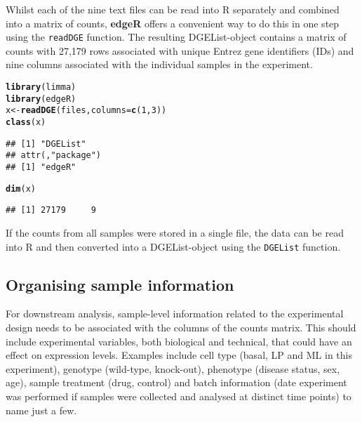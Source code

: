 \documentclass[10pt,a4paper]{extarticle}\usepackage[]{graphicx}\usepackage[]{color}
\makeatletter
\newcommand{\hlnum}[1]{\textcolor[rgb]{0.686,0.059,0.569}{#1}}%
\newcommand{\hlstd}[1]{\textcolor[rgb]{0.345,0.345,0.345}{#1}}%
\newcommand{\hlkwb}[1]{\textcolor[rgb]{0.69,0.353,0.396}{#1}}%
\newcommand{\hlkwc}[1]{\textcolor[rgb]{0.333,0.667,0.333}{#1}}%
\newcommand{\hlkwd}[1]{\textcolor[rgb]{0.737,0.353,0.396}{\textbf{#1}}}%
\newenvironment{kframe}{%
 \def\at@end@of@kframe{}%
 \ifinner\ifhmode%
  \def\at@end@of@kframe{\end{minipage}}%
  \begin{minipage}{\columnwidth}%
 \fi\fi%
 \def\FrameCommand##1{\hskip\@totalleftmargin \hskip-\fboxsep
 \colorbox{shadecolor}{##1}\hskip-\fboxsep
     \hskip-\linewidth \hskip-\@totalleftmargin \hskip\columnwidth}%
 \MakeFramed {\advance\hsize-\width
   \@totalleftmargin\z@ \linewidth\hsize
   \@setminipage}}%
 {\par\unskip\endMakeFramed%
 \at@end@of@kframe}
\newenvironment{knitrout}{}{} %
\makeatother
\begin{document}
Whilst each of the nine text files can be read into \textsf{R} separately and combined into a matrix of counts, \textbf{edgeR} offers a convenient way to do this in one step using the \texttt{readDGE} function. The resulting DGEList-object contains a matrix of counts with 27,179 rows associated with unique Entrez gene identifiers (IDs) and nine columns associated with the individual samples in the experiment.
\begin{knitrout}
\color{fgcolor}\begin{kframe}
\begin{alltt}
\hlkwd{library}\hlstd{(limma)}
\hlkwd{library}\hlstd{(edgeR)}
\hlstd{x} \hlkwb{<-} \hlkwd{readDGE}\hlstd{(files,} \hlkwc{columns}\hlstd{=}\hlkwd{c}\hlstd{(}\hlnum{1}\hlstd{,}\hlnum{3}\hlstd{))}
\hlkwd{class}\hlstd{(x)}
\end{alltt}
\begin{verbatim}
## [1] "DGEList"
## attr(,"package")
## [1] "edgeR"
\end{verbatim}
\begin{alltt}
\hlkwd{dim}\hlstd{(x)}
\end{alltt}
\begin{verbatim}
## [1] 27179     9
\end{verbatim}
\end{kframe}
\end{knitrout}

If the counts from all samples were stored in a single file, the data can be read into \textsf{R} and then converted into a DGEList-object using the \texttt{DGEList} function.

\subsection*{Organising sample information}
For downstream analysis, sample-level information related to the experimental design needs to be associated with the columns of the counts matrix. This should include experimental variables, both biological and technical, that could have an effect on expression levels. Examples include cell type (basal, LP and ML in this experiment), genotype (wild-type, knock-out), phenotype (disease status, sex, age), sample treatment (drug, control) and batch information (date experiment was performed if samples were collected and analysed at distinct time points) to name just a few.\\
\end{document}

